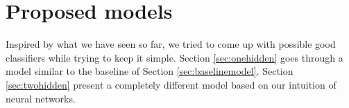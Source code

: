 \begin{table}
\centering
{}
\caption{Precision, recall, f1-score summary table for the baseline model. Support indicates the number of occurrences of each particular class in the true responses (for the test set). Weighted avg is the per metric weighted average where the weights correspond to the support of that class.}
\label{tab:baselineclassificationrep}
\end{table}
\section{Proposed models}
Inspired by what we have seen so far, we tried to come up with possible good classifiers while trying to keep it simple. Section \ref{sec:onehidden} goes through a model similar to the baseline of Section \ref{sec:baselinemodel}. Section \ref{sec:twohidden} present a completely different model based on our intuition of neural networks.
